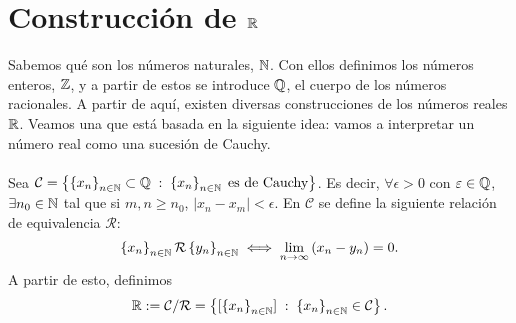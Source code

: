 \chapter{Construcción de $\displaystyle \mathbb{R} $}

Sabemos qué son los números naturales, $\displaystyle \mathbb{N} $. Con ellos definimos los números enteros, $\displaystyle \mathbb{Z} $, y a partir de estos se introduce $\displaystyle \mathbb{Q} $, el cuerpo de los números racionales. A partir de aquí, existen diversas construcciones de los números reales $\displaystyle \mathbb{R} $. Veamos una que está basada en la siguiente idea: vamos a interpretar un número real como una sucesión de Cauchy. \\ \\
Sea $\displaystyle \mathcal{C} = \left\{ \left\{ x_{n}\right\} _{n\in\mathbb{N}}\subset\mathbb{Q}\; : \; \left\{ x_{n}\right\} _{n\in\mathbb{N}} \; \text{es de Cauchy}\right\}  $. Es decir, $\displaystyle \forall \epsilon > 0 $  con $\displaystyle \varepsilon \in \mathbb{Q} $, $\displaystyle \exists n_{0} \in \mathbb{N} $ tal que si $\displaystyle m, n \geq n_{0} $, $\displaystyle \left|x_{n}-x_{m}\right|<\epsilon  $. En $\displaystyle \mathcal{C} $ se define la siguiente relación de equivalencia $\displaystyle \mathcal{R} $:
\[ \left\{ x_{n}\right\} _{n\in\mathbb{N}} \mathcal{R} \left\{ y_{n}\right\} _{n\in\mathbb{N}} \iff \lim_{n \to \infty}\left(x_{n}-y_{n}\right)= 0 .\]
A partir de esto, definimos 
\[\mathbb{R}:= \mathcal{C}/\mathcal{R} = \left\{ [ \left\{ x_{n}\right\} _{n\in\mathbb{N}}] \; : \; \left\{ x_{n}\right\} _{n\in\mathbb{N}}\in\mathcal{C}\right\}  .\]

